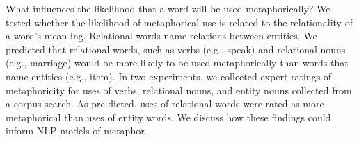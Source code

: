 What influences the likelihood that a word will be used metaphorically? We tested whether the likelihood of metaphorical use is related to the
 relationality of a word's mean-ing. Relational words name relations between
 entities. We predicted that relational words, such as verbs (e.g., speak) and
 relational nouns (e.g., marriage) would be more likely to be used
 metaphorically than words that name entities (e.g., item). In two experiments,
 we collected expert ratings of metaphoricity for uses of verbs, relational
 nouns, and entity nouns collected from a corpus search. As pre-dicted, uses of
 relational words were rated as more metaphorical than uses of entity words. We
 discuss how these findings could inform NLP models of metaphor.

